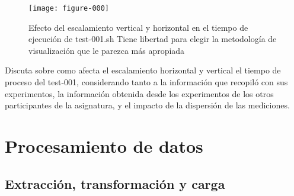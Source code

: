 \documentclass[12pt,letterpaper,twoside]{article}
\begin{document}
\begin{figure}[H]
    \centering
    \texttt{[image: figure-000]}
    \caption{Efecto del escalamiento vertical y horizontal en el tiempo de ejecución de test-001.sh
    {\color{red} Tiene libertad para elegir la metodología de visualización que le parezca más apropiada}}
    \label{fig:001}
\end{figure}

{\color{red} Discuta sobre como afecta el escalamiento horizontal y vertical el tiempo de proceso del test-001, considerando tanto a la información que recopiló con sus experimentos, la información obtenida desde los experimentos de los otros participantes de la asignatura, y el impacto de la dispersión de las mediciones.}

\section{Procesamiento de datos}

\subsection{Extracción, transformación y carga}
\end{document}
